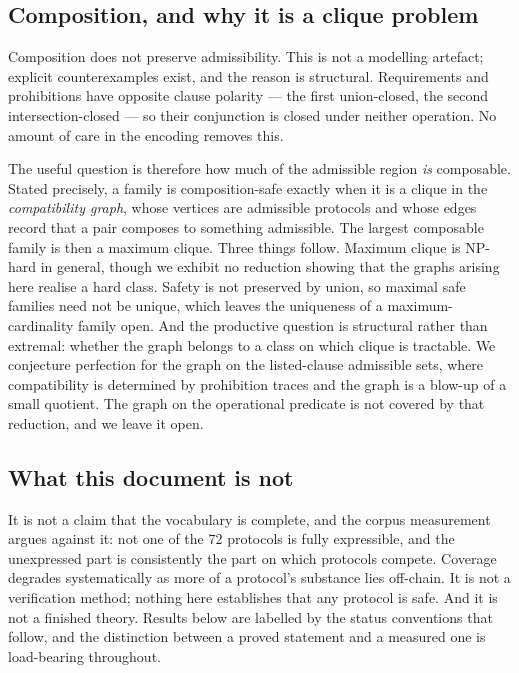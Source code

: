 \documentclass[11pt,reqno]{amsart}
\theoremstyle{plain}
\theoremstyle{definition}
\theoremstyle{remark}
\begin{document}
\subsection{Composition, and why it is a clique problem}

Composition does not preserve admissibility. This is not a modelling artefact;
explicit counterexamples exist, and the reason is structural. Requirements and
prohibitions have opposite clause polarity --- the first union-closed, the second
intersection-closed --- so their conjunction is closed under neither operation.
No amount of care in the encoding removes this.

The useful question is therefore how much of the admissible region \emph{is}
composable. Stated precisely, a family is composition-safe exactly when it is a
clique in the \emph{compatibility graph}, whose vertices are admissible protocols
and whose edges record that a pair composes to something admissible. The largest
composable family is then a maximum clique. Three things follow. Maximum clique is NP-hard in general, though we exhibit no
reduction showing that the graphs arising here realise a hard class. Safety is
not preserved by union, so maximal safe families need not be unique, which
leaves the uniqueness of a maximum-cardinality family open. And the productive
question is structural rather than extremal: whether the graph belongs to a
class on which clique is tractable. We conjecture perfection for the graph on
the listed-clause admissible sets, where compatibility is determined by
prohibition traces and the graph is a blow-up of a small quotient. The graph on
the operational predicate is not covered by that reduction, and we leave it
open.

\subsection{What this document is not}

It is not a claim that the vocabulary is complete, and the corpus measurement
argues against it: not one of the $72$ protocols is fully expressible, and the unexpressed part is
consistently the part on which protocols compete. Coverage degrades systematically as more of a protocol's substance lies
off-chain. It is not a verification method; nothing here establishes that any
protocol is safe. And it is not a finished theory. Results below are labelled by the
status conventions that follow, and the distinction between a proved statement
and a measured one is load-bearing throughout.
\end{document}
